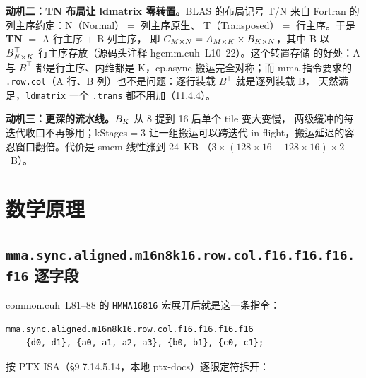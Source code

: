 \textbf{动机二：TN 布局让 ldmatrix 零转置。}\allowbreak{}BLAS 的布局记号
T/N 来自 Fortran 的列主序约定：N（Normal）$=$ 列主序原生、
T（Transposed）$=$ 行主序。于是 \textbf{TN} $=$ A 行主序 $+$ B 列主序，
即 $C\sb {M\times N} = A\sb {M\times K}\times B\sb {K\times N}$，其中 B 以
$B^{\top}\sb {N\times K}$ 行主序存放（源码头注释 hgemm.cuh~L10--22）。这个转置存储
的好处：A 与 $B^{\top}$ 都是行主序、内维都是 K，cp.async 搬运完全对称；而 mma 指令要求的
\texttt{.row.col}（A 行、B 列）也不是问题：逐行装载 $B^{\top}$ 就是逐列装载 B，
天然满足，\texttt{ldmatrix} 一个 \texttt{.trans} 都不用加（11.4.4）。

\textbf{动机三：更深的流水线。}$B\sb K$ 从 8 提到 16 后单个 tile 变大变慢，
两级缓冲的每迭代收口不再够用；kStages$=$3 让一组搬运可以跨迭代
in-flight，搬运延迟的容忍窗口翻倍。代价是 smem 线性涨到 24~KB
（$3\times(128{\times}16{+}128{\times}16)\times2$~B）。

\section{数学原理}

\subsection{\texttt{mma.\allowbreak{}sync.\allowbreak{}aligned.\allowbreak{}m16n8k16.row.\allowbreak{}col.\allowbreak{}f16.f16.f16.f16} 逐字段}

common.cuh~L81--88 的 \texttt{HMMA16816} 宏展开后就是这一条指令：

\begin{lstlisting}[language={}]
mma.sync.aligned.m16n8k16.row.col.f16.f16.f16.f16
    {d0, d1}, {a0, a1, a2, a3}, {b0, b1}, {c0, c1};
\end{lstlisting}

按 PTX ISA（§9.7.14.5.14，本地 ptx-docs）逐限定符拆开：

